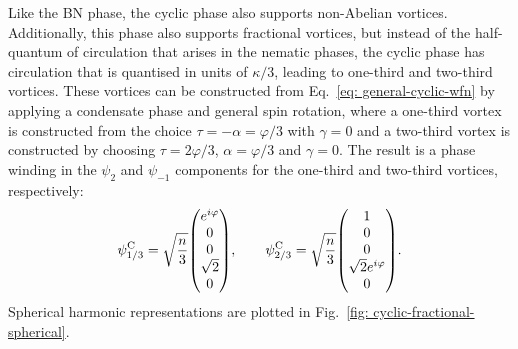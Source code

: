 Like the BN phase, the cyclic phase also supports non-Abelian vortices.
Additionally, this phase also supports fractional vortices, but instead of the
half-quantum of circulation that arises in the nematic phases, the cyclic phase
has circulation that is quantised in units of \(\kappa / 3\),
leading to one-third and two-third vortices.
These vortices can be constructed from Eq.~\eqref{eq: general-cyclic-wfn} by
applying a condensate phase and general spin rotation, where a one-third vortex
is constructed from the choice \(\tau = -\alpha = \varphi/3 \) with
\(\gamma = 0\) and a two-third vortex is constructed by choosing
\(\tau = 2\varphi/3\), \(\alpha = \varphi/3\) and \(\gamma=0\).
The result is a phase winding in the \(\psi_2\) and \(\psi_{-1}\) components
for the one-third and two-third vortices, respectively:
\begin{equation}
    \psi^\text{C}_{1/3} = \sqrt{\frac{n}{3}}\mqty(e^{i\varphi} \\ 0 \\ 0 \\
    \sqrt{2}\\0),
    \qquad
    \psi^\text{C}_{2/3} = \sqrt{\frac{n}{3}}\mqty(1 \\ 0 \\ 0 \\
    \sqrt{2}e^{i\varphi}\\0).
\end{equation}
Spherical harmonic representations are plotted in
Fig.~\ref{fig: cyclic-fractional-spherical}.

